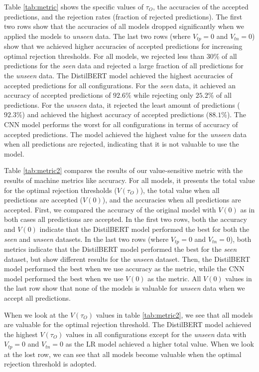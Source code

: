 %
Table \ref{tab:metric} shows the specific values of $\tau_O$, the accuracies of the accepted predictions, and the rejection rates (fraction of rejected predictions).
%
The first two rows show that the accuracies of all models dropped significantly when we applied the models to \emph{unseen} data.
%
The last two rows (where $V_{tp}=0$ and $V_{tn}=0$) show that we achieved higher accuracies of accepted predictions for increasing optimal rejection thresholds.
%
For all models, we rejected less than 30\% of all predictions for the \emph{seen} data and rejected a large fraction of all predictions for the \emph{unseen} data.
%
The DistilBERT model achieved the highest accuracies of accepted predictions for all configurations.
%
For the \emph{seen} data, it achieved an accuracy of accepted predictions of $92.6\%$ while rejecting only $25.2\%$ of all predictions.
%
For the \emph{unseen} data, it rejected the least amount of predictions ($92.3\%$) and achieved the highest accuracy of accepted predictions ($88.1\%$).
%
The CNN model performs the worst for all configurations in terms of accuracy of accepted predictions.
%
The model achieved the highest value for the \emph{unseen} data when all predictions are rejected, indicating that it is not valuable to use the model.

%
Table \ref{tab:metric2} compares the results of our value-sensitive metric with the results of machine metrics like accuracy.
%
For all models, it presents the total value for the optimal rejection thresholds ($V(\tau_O)$), the total value when all predictions are accepted ($V(0)$), and the accuracies when all predictions are accepted.
%
First, we compared the accuracy of the original model with $V(0)$ as in both cases all predictions are accepted.
%
In the first two rows, both the accuracy and $V(0)$ indicate that the DistilBERT model performed the best for both the \emph{seen} and \emph{unseen} datasets.
%
In the last two rows (where $V_{tp}=0$ and $V_{tn}=0$), both metrics indicate that the DistilBERT model performed the best for the \emph{seen} dataset, but show different results for the \emph{unseen} dataset.
%
Then, the DistilBERT model performed the best when we use accuracy as the metric, while the CNN model performed the best when we use $V(0)$ as the metric.
%
All $V(0)$ values in the last row show that none of the models is valuable for \emph{unseen} data when we accept all predictions.
%

%
When we look at the $V(\tau_O)$ values in table \ref{tab:metric2}, we see that all models are valuable for the optimal rejection threshold.
%
The DistilBERT model achieved the highest $V(\tau_O)$ values in all configurations except for the \emph{unseen} data with $V_{tp}=0$ and $V_{tn}=0$ as the LR model achieved a higher total value.
%
When we look at the lost row, we can see that all models become valuable when the optimal rejection threshold is adopted.

